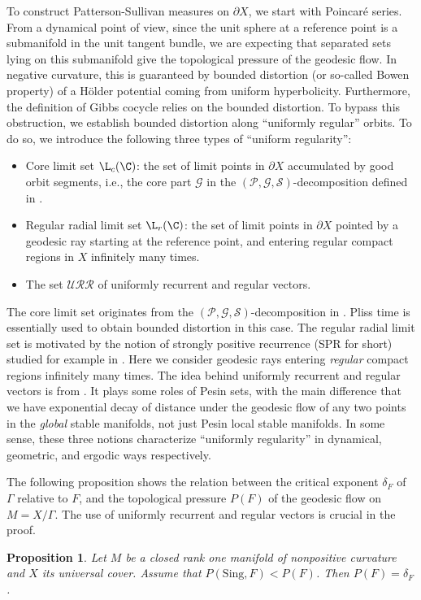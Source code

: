 \documentclass[11pt]{amsart}
\newtheorem{proposition}[theorem]{Proposition}
\theoremstyle{definition}
\newcommand{\SSS}{\mathcal{S}}
\newcommand{\GGG}{\mathcal{G}}
\def\P{{\mathcal P}}
\newcommand{\URR}{\mathcal{URR}}
\def\pX{{\partial X}}
\def\d{\delta}   %
\begin{document}
To construct Patterson-Sullivan measures on $\pX$, we start with Poincar\'{e} series. From a dynamical point of view, since the unit sphere at a reference point is a submanifold in the unit tangent bundle, we are expecting that separated sets lying on this submanifold give the topological pressure of the geodesic flow. In negative curvature, this is guaranteed by bounded distortion (or so-called Bowen property)  of a H\"{o}lder potential coming from uniform hyperbolicity. Furthermore, the definition of Gibbs cocycle relies on the bounded distortion. To bypass this obstruction, we establish bounded distortion along ``uniformly regular'' orbits. To do so, we introduce the following three types of ``uniform regularity'':

\begin{itemize}
\item Core limit set $\L_c(\C)$: the set of limit points in $\pX$ accumulated by good orbit segments, i.e., the core part $\GGG$ in the $(\P,\GGG,\SSS)$-decomposition defined in \cite{BCFT}.
\item Regular radial limit set $\L_r(\C)$: the set of limit points in $\pX$ pointed by a geodesic ray starting at the reference point, and entering regular compact regions in $X$ infinitely many times.
\item The set $\URR$ of uniformly recurrent and regular vectors. 
\end{itemize}
The core limit set originates from the $(\P,\GGG,\SSS)$-decomposition in \cite{BCFT}. Pliss time is essentially used to obtain bounded distortion in this case. The regular radial limit set is motivated by the notion of strongly positive recurrence (SPR for short) studied for example in \cite{GST}. Here we consider geodesic rays entering \textit{regular} compact regions infinitely many times. The idea behind uniformly recurrent and regular vectors is from \cite{BBE}. It plays some roles of Pesin sets, with the main difference that we have exponential decay of distance under the geodesic flow of any two points in the \textit{global} stable manifolds, not just Pesin local stable manifolds. In some sense, these three notions characterize ``uniformly regularity'' in dynamical, geometric, and ergodic ways respectively.

The following proposition shows the relation between the critical exponent $\d_F$ of $\Gamma$ relative to $F$, and the topological pressure $P(F)$ of the geodesic flow on $M=X/\Gamma$. The use of uniformly recurrent and regular vectors is crucial in the proof. 
\begin{proposition}\label{pro9}
Let $M$ be a closed rank one manifold of nonpositive curvature and $X$ its universal cover. Assume that $P(\text{Sing},F)<P(F)$. Then $P(F)=\delta_F$.
\end{proposition}
\end{document}
